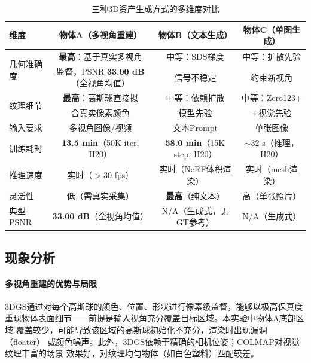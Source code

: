 \documentclass{article}
\begin{document}
\begin{table}[h]
  \centering
  \caption{三种3D资产生成方式的多维度对比}
  \label{tab:quality_compare}
  \begin{tabular}{lccc}
    \toprule
    维度 & 物体A（多视角重建） & 物体B（文本生成）
         & 物体C（单图生成） \\
    \midrule
    \multirow{2}{*}{几何准确度}
        & \textbf{最高}：基于真实多视角 & 中等：SDS梯度  & 中等：扩散先验\\
        & 监督，PSNR \textbf{33.00 dB}（全视角均值） & 信号不稳定 & 约束新视角 \\
    \midrule
    \multirow{2}{*}{纹理细节}
        & \textbf{最高}：高斯球直接拟 & 中等：依赖扩散 & 中等：Zero123+\\
        & 合真实像素颜色 & 模型先验 & +视觉先验 \\
    \midrule
    输入要求 & 多视角图像/视频 & 文本Prompt & 单张图像 \\
    \midrule
    训练耗时 & \textbf{13.5 min}（50K iter, H20） & \textbf{58.0 min}（15K step, H20）
             & $\sim$32 s（推理，H20） \\
    \midrule
    推理速度 & 实时（$>$30 fps） & 实时（NeRF体积渲染）
             & 实时（mesh渲染） \\
    \midrule
    灵活性 & 低（需真实采集） & \textbf{最高}（纯文本）
            & 高（单张照片）\\
    \midrule
    典型PSNR & \textbf{33.00 dB}（全视角均值） & N/A（生成式，无GT参考） & N/A（生成式） \\
    \bottomrule
  \end{tabular}
\end{table}

\subsection{现象分析}

\paragraph{多视角重建的优势与局限}
3DGS通过对每个高斯球的颜色、位置、形状进行像素级监督，能够以极高保真度
重现物体表面细节——前提是输入视角充分覆盖目标区域。本实验中物体A底部区域
覆盖较少，可能导致该区域的高斯球初始化不充分，渲染时出现漏洞（floater）
或颜色噪声。此外，3DGS依赖于精确的相机位姿；COLMAP对视觉纹理丰富的场景
效果好，对纹理均匀物体（如白色塑料）匹配较差。
\end{document}
